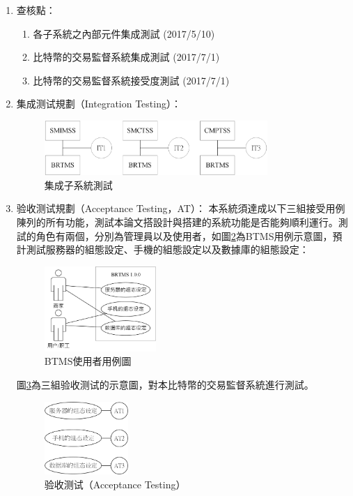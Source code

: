 \begin{enumerate}
			\item 查核點：

				\begin{enumerate}
	 				\item 各子系統之內部元件集成測試 (2017/5/10)
	 				\item 比特幣的交易監督系統集成測試 (2017/7/1)
	 				\item 比特幣的交易監督系統接受度測試 (2017/7/1)
	 			\end{enumerate}

	 		\item 集成测试規劃（Integration Testing）：
	 			\begin{figure}[!htbp]
					\centering
					\includegraphics[width = 0.8\textwidth]{IntegrationTesting.png}
					\caption{集成子系統測試}\label{IntegrationTesting}
				\end{figure}
			\item 验收测试規劃（Acceptance Testing，AT）：
				本系統須達成以下三組接受用例陳列的所有功能，測試本論文搭設計與搭建的系統功能是否能夠順利運行。測試的角色有兩個，分別為管理員以及使用者，如圖\ref{usecasediagram}為BTMS用例示意圖，預計測試服務器的組態設定、手機的組態設定以及數據庫的組態設定：

					\begin{figure}[!htbp]
						\centering
						\includegraphics[width = 0.4\textwidth]{usecasediagram.jpg}
						\caption{BTMS使用者用例圖}\label{usecasediagram}
					\end{figure}

				圖\ref{AcceptanceTesting}為三組验收测试的示意圖，對本比特幣的交易監督系統進行測試。
					\begin{figure}[!htbp]
						\centering
						\includegraphics[width = 0.3\textwidth]{AcceptanceTesting.png}
						\caption{验收测试（Acceptance Testing）}\label{AcceptanceTesting}
					\end{figure}

	 		\end{enumerate}			

